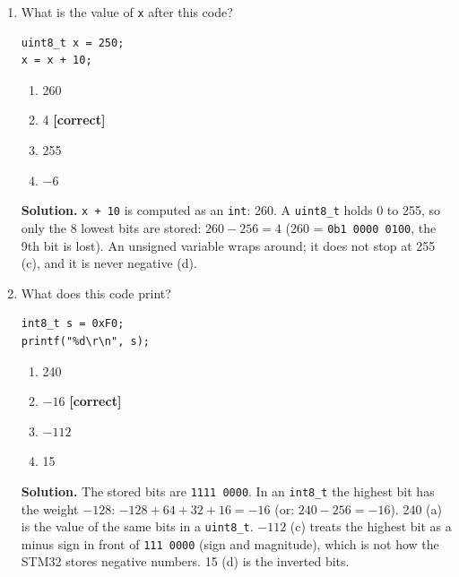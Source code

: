 \documentclass[11pt,a4paper]{article}
\newcommand{\correct}{\quad\textcolor{green!50!black}{\textbf{[correct]}}}
\newenvironment{solution}{\par\noindent\ignorespaces}{\par}
\begin{document}
\begin{enumerate}[label=\textbf{Q\arabic*.}, leftmargin=2.5em, itemsep=6pt]
  \item What is the value of \texttt{x} after this code?
\begin{lstlisting}
uint8_t x = 250;
x = x + 10;
\end{lstlisting}
  \begin{enumerate}[label=(\alph*)]
    \item 260
    \item 4 \correct
    \item 255
    \item $-6$
  \end{enumerate}
  \begin{solution}
  \textbf{Solution.} \texttt{x + 10} is computed as an \texttt{int}: 260. A \texttt{uint8\_t} holds 0 to 255, so only
  the 8 lowest bits are stored: $260 - 256 = 4$ (260 = \texttt{0b1\,0000\,0100}, the 9th bit is lost). An unsigned
  variable wraps around; it does not stop at 255 (c), and it is never negative (d).
  \end{solution}

  \item What does this code print?
\begin{lstlisting}
int8_t s = 0xF0;
printf("%d\r\n", s);
\end{lstlisting}
  \begin{enumerate}[label=(\alph*)]
    \item 240
    \item $-16$ \correct
    \item $-112$
    \item 15
  \end{enumerate}
  \begin{solution}
  \textbf{Solution.} The stored bits are \texttt{1111\,0000}. In an \texttt{int8\_t} the highest bit has the weight
  $-128$: $-128 + 64 + 32 + 16 = -16$ (or: $240 - 256 = -16$). 240 (a) is the value of the same bits in a
  \texttt{uint8\_t}. $-112$ (c) treats the highest bit as a minus sign in front of \texttt{111\,0000} (sign and
  magnitude), which is not how the STM32 stores negative numbers. 15 (d) is the inverted bits.
  \end{solution}


\end{enumerate}
\end{document}
